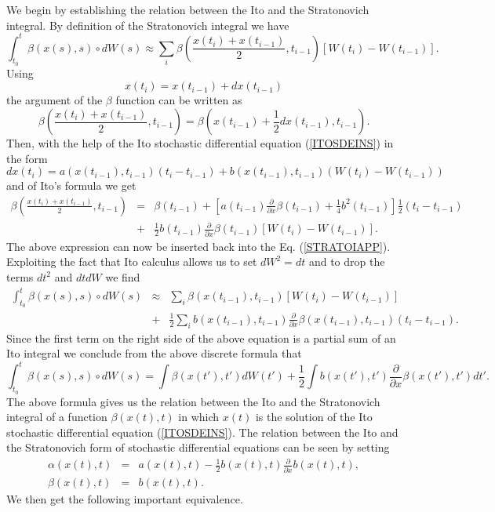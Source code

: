 We begin by establishing the relation between the Ito and the 
Stratonovich integral. By definition of the Stratonovich integral 
we have
\begin{equation}
\label{STRATOIAPP}
\int_{t_0}^t  \beta(x(s),s) \circ dW(s) \approx
 \sum_i \beta \left( \frac{x(t_i) + x(t_{i-1})}{2},t_{i-1} \right)
  [W(t_i) -W(t_{i-1})].
\end{equation}
Using
\begin{equation*}
x(t_i) = x(t_{i-1}) + dx(t_{i-1})
\end{equation*}
the argument of the $\beta$ function can be written as
\begin{equation*}
\beta \left( \frac{x(t_i) + x(t_{i-1})}{2},t_{i-1} \right) =
 \beta \left( x(t_{i-1}) + \frac{1}{2} dx(t_{i-1}) ,t_{i-1}\right).
\end{equation*}
Then, with the help of the Ito stochastic differential equation 
(\ref{ITOSDEINS}) in the form
\begin{equation*}
dx(t_i) = a(x(t_{i-1}),t_{i-1}) (t_i -t_{i-1}) + 
   b(x(t_{i-1}),t_{i-1}) (W(t_i) -W(t_{i-1}))
\end{equation*}
and of Ito's formula we get
\begin{eqnarray*}
\beta \left( \frac{x(t_i) + x(t_{i-1})}{2},t_{i-1} \right) & = &
 \beta(t_{i-1}) + \left[ a(t_{i-1}) \frac{\partial}{\partial x} 
 \beta(t_{i-1}) + \frac{1}{4} b^2(t_{i-1})
                  \right] \frac{1}{2}(t_{i} - t_{i-1}) \\
 &  + & \frac{1}{2} b(t_{i-1}) \frac{\partial}{\partial x} 
 \beta(t_{i-1}) [W(t_i) - W(t_{i-1})].
\end{eqnarray*}
The above expression can now be inserted back into the Eq. 
(\ref{STRATOIAPP}). Exploiting the fact that Ito calculus allows us to set 
$dW^2=dt$ and to drop the terms $dt^2$ and $dtdW$ we find
\begin{eqnarray*}
\int_{t_0}^t  \beta(x(s),s) \circ dW(s) & \approx &
\sum_i \beta(x(t_{i-1}),t_{i-1}) [W(t_i) - W(t_{i-1})] \\
 &  + & \frac{1}{2} \sum_i b(x(t_{i-1}),t_{i-1}) 
 \frac{\partial}{\partial x} \beta(x(t_{i-1}),t_{i-1}) (t_i - 
 t_{i-1}).
\end{eqnarray*}
Since the first term on the right side of the above equation is a
partial sum of an Ito integral we conclude from the above discrete
formula that
\begin{equation}
\int_{t_0}^t  \beta(x(s),s) \circ dW(s) = 
\int  \beta(x(t'),t') dW(t') 
 + \frac{1}{2} \int b(x(t'),t') 
 \frac{\partial}{\partial x} \beta(x(t'),t') dt'.
\end{equation}
The above formula gives us the relation between the Ito and the 
Stratonovich integral of a function $\beta(x(t),t)$ in which $x(t)$
is the solution of the Ito stochastic differential equation
(\ref{ITOSDEINS}). The relation between the Ito and the 
Stratonovich form of stochastic differential equations can be seen 
by setting
\begin{eqnarray*}
\alpha(x(t),t) & = & a(x(t),t) - \frac{1}{2} b(x(t),t) 
\frac{\partial}{\partial x} b(x(t),t), \\
\beta(x(t),t) & = & b(x(t),t).
\end{eqnarray*}
We then get the following important equivalence.


